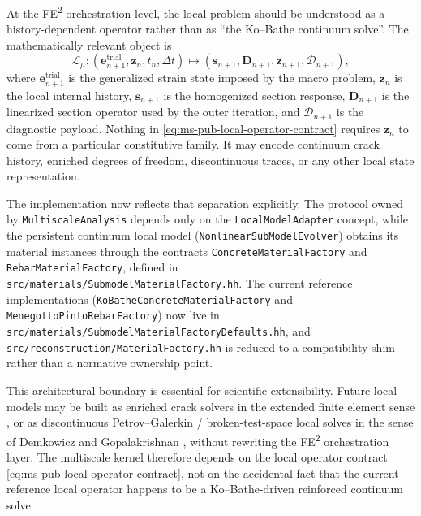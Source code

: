 At the FE\textsuperscript{2} orchestration level, the local problem should be
understood as a history-dependent operator rather than as ``the Ko--Bathe
continuum solve''.  The mathematically relevant object is
\begin{equation}
  \mathcal{L}_{\mu} :
  \left(
    \mathbf{e}_{n+1}^{\mathrm{trial}},
    \mathbf{z}_{n},
    t_n,
    \Delta t
  \right)
  \mapsto
  \left(
    \mathbf{s}_{n+1},
    \mathbf{D}_{n+1},
    \mathbf{z}_{n+1},
    \mathcal{D}_{n+1}
  \right),
  \label{eq:ms-pub-local-operator-contract}
\end{equation}
where \(\mathbf{e}_{n+1}^{\mathrm{trial}}\) is the generalized strain state
imposed by the macro problem, \(\mathbf{z}_n\) is the local internal history,
\(\mathbf{s}_{n+1}\) is the homogenized section response,
\(\mathbf{D}_{n+1}\) is the linearized section operator used by the outer
iteration, and \(\mathcal{D}_{n+1}\) is the diagnostic payload.  Nothing in
\eqref{eq:ms-pub-local-operator-contract} requires \(\mathbf{z}_n\) to come
from a particular constitutive family.  It may encode continuum crack history,
enriched degrees of freedom, discontinuous traces, or any other local state
representation.

The implementation now reflects that separation explicitly.  The protocol owned
by \texttt{MultiscaleAnalysis} depends only on the
\texttt{LocalModelAdapter} concept, while the persistent continuum local model
(\texttt{NonlinearSubModelEvolver}) obtains its material instances through the
contracts \texttt{ConcreteMaterialFactory} and
\texttt{RebarMaterialFactory}, defined in
\texttt{src/materials/SubmodelMaterialFactory.hh}.  The current reference
implementations
(\texttt{KoBatheConcreteMaterialFactory} and
\texttt{MenegottoPintoRebarFactory}) now live in
\texttt{src/materials/SubmodelMaterialFactoryDefaults.hh}, and
\texttt{src/reconstruction/MaterialFactory.hh} is reduced to a compatibility
shim rather than a normative ownership point.

This architectural boundary is essential for scientific extensibility.  Future
local models may be built as enriched crack solvers in the extended finite
element sense \cite{BelytschkoBlack1999}, or as discontinuous
Petrov--Galerkin / broken-test-space local solves in the sense of
Demkowicz and Gopalakrishnan \cite{DemkowiczGopalakrishnan2010}, without
rewriting the FE\textsuperscript{2} orchestration layer.  The multiscale kernel
therefore depends on the local operator contract
\eqref{eq:ms-pub-local-operator-contract}, not on the accidental fact that the
current reference local operator happens to be a Ko--Bathe-driven reinforced
continuum solve.


